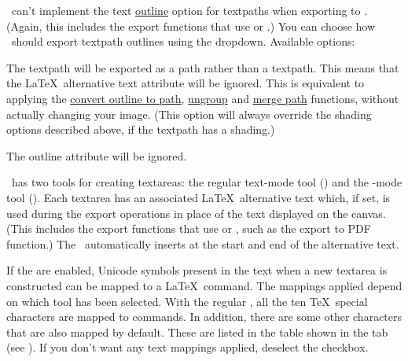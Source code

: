 
\FlowframTk\ can't implement the text
\hyperref[sec:textoutline]{outline} option for
\glspl{textpath} when exporting to . (Again, this
includes the export functions that use  or .)
You can choose how \FlowframTk\ should export \gls{textpath}
outlines using the 
\gls*{dropdown}. Available options:

\begin{deflist}
\itemtitle
 {}

\begin{itemdesc}
The \gls{textpath} will be exported as a path rather than a
\gls{textpath}. This means that the \LaTeX\
alternative text attribute will be ignored. This is equivalent to
applying the
\hyperref[sec:outlinetopath]{convert outline to path}, 
\hyperref[sec:grouping]{ungroup} and 
\hyperref[sec:mergepaths]{merge path}
functions, without actually changing your image.
(This option will always override the shading options described
above, if the \gls{textpath} has a shading.)
\end{itemdesc}

\itemtitle
 {}

\begin{itemdesc}
The outline attribute will be ignored.
\end{itemdesc}

\end{deflist}

%
%
\FlowframTk\ has two tools for creating \glspl{textarea}: the
regular text-mode tool () and the
-mode tool (). Each \gls{textarea} has an
associated \LaTeX\ alternative text which, if set, is used
during the  export operations in place of the
text displayed on the \gls{canvas}. (This includes the export
functions that use  or , such as
the export to PDF function.) The \mathstool\ automatically
inserts  at the start and end of the
alternative text. 

If the  are enabled, Unicode symbols present in
the text when a new \gls*{textarea} is constructed can be mapped to
a \LaTeX\ command.
The mappings applied depend on which tool has been selected. With
the regular \texttool, all the ten \TeX\ special characters are
mapped to commands. In addition, there are some other characters
that are also mapped by default. These are listed in the table shown
in the \widget{textconfig.textmode} tab (see
). If you don't want any
text mappings applied, deselect the
 \gls{checkbox}.

